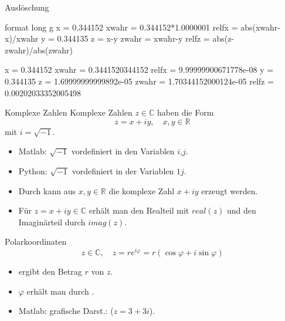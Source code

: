 \documentclass[hyperref={xetex}]{beamer}
\begin{document}
\begin{frame}[fragile]{Auslöschung}
\begin{matlabin}
format long g %
x = 0.344152
xwahr = 0.344152*1.0000001 %
relfx = abs(xwahr-x)/xwahr
y = 0.344135
z = x-y
zwahr = xwahr-y
relfz = abs(z-zwahr)/abs(zwahr) %
\end{matlabin}
\begin{matlab}
x = 0.344152
xwahr = 0.3441520344152
relfx = 9.99999900671778e-08
y = 0.344135
z = 1.69999999999892e-05
zwahr = 1.70344152000124e-05
relfz = 0.00202033352005498
\end{matlab}

\end{frame}



%
%
\begin{frame}[fragile]{Komplexe Zahlen}
Komplexe Zahlen $z \in \mathbb{C}$ haben die Form
\[ z = x +iy, \quad x,y \in \mathbb{R} \]
mit $i=\sqrt{-1}$. 
\begin{itemize}
\item Matlab: $\sqrt{-1}$  vordefiniert in den Variablen $i$,$j$.
\item Python: $\sqrt{-1}$  vordefiniert in der Variablen $1j$.
\item Durch   kann aus $x,y \in
  \mathbb{R}$ die komplexe Zahl $x + iy$ erzeugt werden.
\item Für $z=x+iy \in \mathbb{C}$ erhält man den Realteil mit
  $real(z)$ und den Imaginärteil durch $imag(z)$. 
\end{itemize} 
\end{frame}
\begin{frame}[fragile]{Polarkoordinaten}
\alert{ \[ z \in \mathbb{C}, \quad z=re^{i \varphi}=r(\cos \varphi + i \sin
  \varphi) \]}
\begin{itemize}
\item {} ergibt den Betrag $r$ von $z$.
\item $\varphi$ erhält man durch .
\item Matlab: grafische Darst.:   ($z=3+3i$). \\
 \\ 
\end{itemize}
\end{frame}
\end{document}
